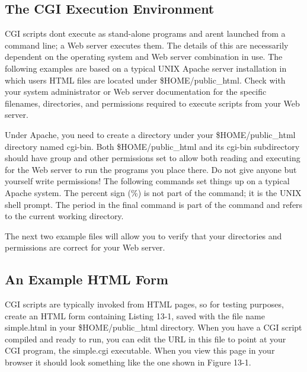 \subsection{The CGI Execution Environment}

CGI scripts don{\textquotesingle}t execute as stand-alone programs and
aren{\textquotesingle}t launched from a command line; a Web server
executes them. The details of this are necessarily dependent on the
operating system and Web server combination in use. The following
examples are based on a typical UNIX Apache server installation in
which users{\textquotesingle} HTML files are located under
\textsf{\$HOME/public\_html}. Check with your system administrator or
Web server documentation for the specific filenames, directories, and
permissions required to execute scripts from your Web server. 

Under Apache, you need to create a directory under your
\textsf{\$HOME/public\_html} directory named \textsf{cgi-bin}. Both
\textsf{\$HOME/public\_html} and its \textsf{cgi-bin} subdirectory
should have {\textquotedbl}group{\textquotedbl} and
{\textquotedbl}other{\textquotedbl} permissions set to allow both
reading and executing for the Web server to run the programs you place
there. Do not give anyone but yourself write permissions! The following
commands set things up on a typical Apache system. The percent sign
(\textsf{\%}) is not part of the command; it is the UNIX shell prompt.
The period in the final command is part of the command and refers to
the current working directory.


The next two example files will allow you to verify that your
directories and permissions are correct for your Web server.

\subsection{An Example HTML Form}

CGI scripts are typically invoked from HTML pages, so for testing
purposes, create an HTML form containing Listing 13-1, saved with the
file name \textsf{simple.html} in your \textsf{\$HOME/public\_html}
directory. When you have a CGI script compiled and ready to run, you
can edit the URL in this file to point at your CGI program, the
\textsf{simple.cgi} executable. When you view this page in your browser
it should look something like the one shown in Figure 13-1.

